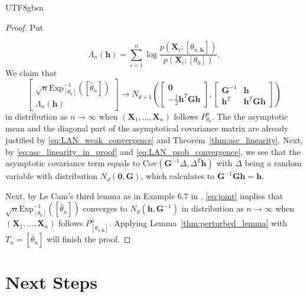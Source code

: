 \documentclass[12pt]{report}
\newcommand{\bracket}[1]{\left ( #1 \right )}
\newcommand{\squared}[1]{\left [ #1 \right ]}
\theoremstyle{plain}
\theoremstyle{definition}
\begin{document}
\begin{CJK*}{UTF8}{gbsn}
\begin{proof}
Put 

\begin{equation*}
  \Lambda_n(\bm{h}) = \sum_{i=1}^n \log \frac{p\bracket{\bm{X}_i; \squared{\theta_{n, \bm{h}}}}}{p(\bm{X}_i; [\theta_0])}.
\end{equation*}
We claim that 
\begin{equation}\label{eq:joint}
    \begin{bmatrix}
      \sqrt{n}\text{Exp}^{-1}_{\squared{\theta_0}}\bracket{\squared{\hat{\theta}_n}} \\
      \Lambda_n(\bm{h})
    \end{bmatrix}
  \to
  N_{d+1}\bracket{
  \begin{bmatrix} 
    \bm{0}\\ -\frac{1}{2}\bm{h}^T\bm{G}\bm{h}
  \end{bmatrix},
  \begin{bmatrix} \bm{G}^{-1} & \bm{h} \\
  \bm{h}^T & \bm{h}^T\bm{G}\bm{h}
\end{bmatrix}}
\end{equation}
in distribution as $n \to \infty$ when 
$(\bm{X}_1, \ldots, \bm{X}_n)$ follows $P^n_{\theta_0}$.
The the asymptotic mean and the diagonal part of the asymptotical
covariance matrix
are already justified by 
\eqref{eq:LAN_weak_convergence}
and Theorem~\ref{thm:asc_linearity}.
Next, by \eqref{eq:asc_linearity_in_proof}
and \eqref{eq:LAN_prob_convergence},
we see that the asymptotic covariance term 
equals to $\text{Cov}(\bm{G}^{-1}\Delta,\Delta^T\bm{h})$
with $\Delta$ being a random variable 
with distribution $N_d \bracket{\bm{0}, \bm{G}}$,
which calculates to $\bm{G}^{-1}\bm{G}\bm{h} = \bm{h}$.

Next, by Le Cam's third lemma as in Example 6.7 in \cite{van_der_Vaart_1998}, \eqref{eq:joint}
implies that $\sqrt{n}\text{Exp}^{-1}_{\squared{\theta_0}}\bracket{\squared{\hat{\theta}_n}}$
converges to $N_d(\bm{h}, \bm{G}^{-1})$ in distribution as $n \to \infty$
when $(\bm{X}_1, \ldots, \bm{X}_n)$ 
follows $P^n_{\squared{\theta_{n,\bm{h}}}}$.
Applying Lemma~\ref{thm:perturbed_lemma} with $T_n = \squared{\hat{\theta}_n}$
will finish the proof.

\end{proof}

\chapter{Next Steps}


\end{CJK*}
\end{document}
